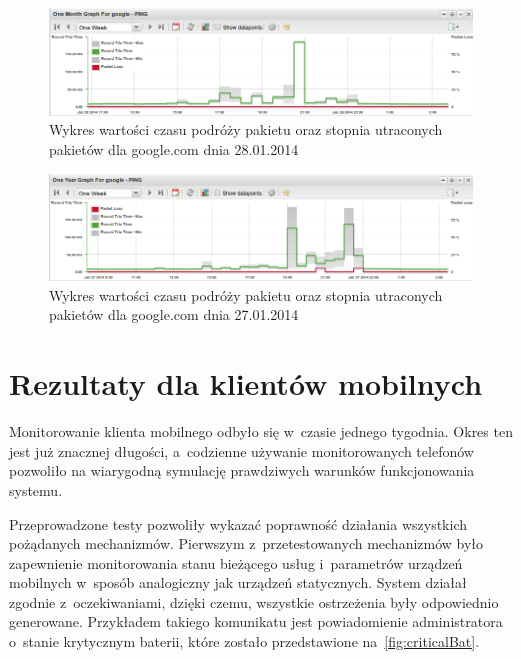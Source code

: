 \begin{figure}[H]
  \caption{Wykres wartości czasu podróży pakietu oraz stopnia
    utraconych pakietów dla google.com dnia 28.01.2014}
  \label{fig:google2801}
  \centering
\includegraphics[width=1\textwidth]{img/google2801.png}
\end{figure}

\begin{figure}[H]
  \caption{Wykres wartości czasu podróży pakietu oraz stopnia
    utraconych pakietów dla google.com dnia 27.01.2014}
  \label{fig:google2701}
  \centering
\includegraphics[width=1\textwidth]{img/google2701.png}
\end{figure}


\section[Klient mobilny][Rezultaty dla klientów mobilnych]{Rezultaty dla klientów mobilnych}

Monitorowanie klienta mobilnego odbyło się w~czasie jednego
tygodnia. Okres ten jest już znacznej długości, a~codzienne używanie
monitorowanych telefonów pozwoliło na wiarygodną symulację prawdziwych
warunków funkcjonowania systemu.

Przeprowadzone testy pozwoliły wykazać poprawność działania wszystkich
pożądanych mechanizmów. Pierwszym z~przetestowanych mechanizmów było
zapewnienie monitorowania stanu bieżącego usług i~parametrów urządzeń
mobilnych w~sposób analogiczny jak urządzeń statycznych. System
działał zgodnie z~oczekiwaniami, dzięki czemu, wszystkie ostrzeżenia
były odpowiednio generowane. Przykładem takiego komunikatu jest
powiadomienie administratora o~stanie krytycznym baterii, które
zostało przedstawione na~\ref{fig:criticalBat}.

